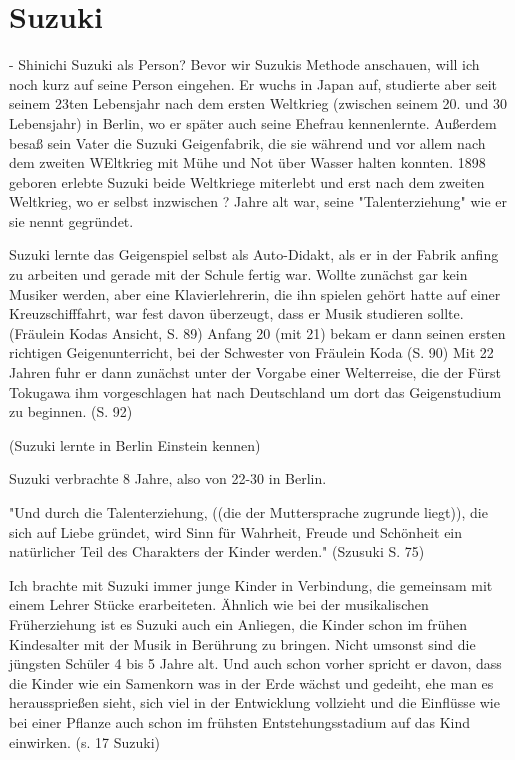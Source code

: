 \section{Suzuki}

- Shinichi Suzuki als Person?
Bevor wir Suzukis Methode anschauen, will ich noch kurz auf seine Person
eingehen. Er wuchs in Japan auf, studierte aber seit seinem 23ten Lebensjahr nach dem ersten Weltkrieg (zwischen seinem 20. und 30 Lebensjahr)
in Berlin, wo er später auch seine Ehefrau kennenlernte. Außerdem besaß sein
Vater die Suzuki Geigenfabrik, die sie während und vor allem nach dem zweiten
WEltkrieg mit Mühe und Not über Wasser halten konnten. 1898 geboren erlebte Suzuki beide Weltkriege miterlebt und erst nach
dem
zweiten Weltkrieg, wo er selbst inzwischen ? Jahre alt war, seine
"Talenterziehung" wie er sie nennt gegründet. 

Suzuki lernte das Geigenspiel selbst als Auto-Didakt, als er in der Fabrik
anfing zu arbeiten und gerade mit der Schule fertig war. Wollte zunächst gar
kein Musiker werden, aber eine Klavierlehrerin, die ihn spielen gehört hatte auf
einer Kreuzschifffahrt, war fest davon überzeugt, dass er Musik studieren
sollte.(Fräulein Kodas Ansicht, S. 89)
Anfang 20 (mit 21) bekam er dann seinen ersten richtigen Geigenunterricht, bei der Schwester
von Fräulein Koda (S. 90) 
Mit 22 Jahren fuhr er dann zunächst unter der Vorgabe einer Welterreise, die der
Fürst Tokugawa ihm vorgeschlagen hat nach Deutschland um dort das Geigenstudium zu
beginnen. (S. 92)

(Suzuki lernte in Berlin Einstein kennen)

Suzuki verbrachte 8 Jahre, also von 22-30 in Berlin. 

"Und durch die Talenterziehung, ((die der Muttersprache zugrunde liegt)), die
sich auf Liebe gründet, wird Sinn für Wahrheit, Freude und Schönheit ein
natürlicher Teil des Charakters der Kinder werden." (Szusuki S. 75)

Ich brachte mit Suzuki immer junge Kinder in Verbindung, die gemeinsam mit einem
Lehrer Stücke erarbeiteten. 
Ähnlich wie bei der musikalischen Früherziehung ist es Suzuki auch ein Anliegen,
die Kinder schon im frühen Kindesalter mit der Musik in Berührung zu bringen.
Nicht umsonst sind die jüngsten Schüler 4 bis 5 Jahre alt. Und auch schon vorher
spricht er davon, dass die Kinder wie ein Samenkorn was in der Erde wächst und
gedeiht, ehe man es heraussprießen sieht, sich viel in der Entwicklung vollzieht
und die Einflüsse wie bei einer Pflanze auch schon im frühsten
Entstehungsstadium auf das Kind einwirken. (s. 17 Suzuki)

